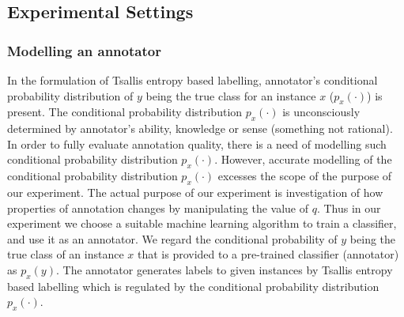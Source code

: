 \documentclass[a4paper,conference]{IEEEtran}
\begin{document}
\subsection{Experimental Settings}
\subsubsection{Modelling an annotator}\label{subsec:annotation_process}
In the formulation of Tsallis entropy based labelling, annotator's conditional probability distribution of $y$ being the true class for an instance $x$ ($p_{x}(\cdot)$) is present.
The conditional probability distribution $p_{x}(\cdot)$ is unconsciously determined by annotator's ability, knowledge or sense (something not rational).
In order to fully evaluate annotation quality, there is a need of modelling such conditional probability distribution $p_{x}(\cdot)$.
However, accurate modelling of the conditional probability distribution $p_{x}(\cdot)$ excesses the scope of the purpose of our experiment.
The actual purpose of our experiment is investigation of how properties of annotation changes by manipulating the value of $q$.
Thus in our experiment we choose a suitable machine learning algorithm to train a classifier, and use it as an annotator.
We regard the conditional probability of $y$ being the true class of an instance $x$ that is provided to a pre-trained classifier (annotator) as $p_{x}(y)$.
The annotator generates labels to given instances by Tsallis entropy based labelling which is regulated by the conditional probability distribution $p_{x}(\cdot)$.
\end{document}

